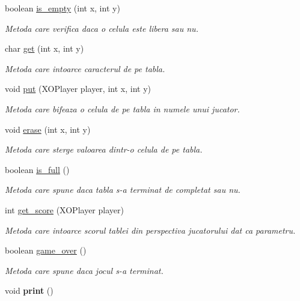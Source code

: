 \begin{DoxyCompactItemize}
\item 
boolean \hyperlink{classXOBoard_a6c374e5e5961b1223e08df188c276379}{is\_\-empty} (int x, int y)
\begin{DoxyCompactList}\small\item\em Metoda care verifica daca o celula este libera sau nu. \item\end{DoxyCompactList}\item 
char \hyperlink{classXOBoard_a45c7e3b053887aed0d4fbaf27bad4789}{get} (int x, int y)
\begin{DoxyCompactList}\small\item\em Metoda care intoarce caracterul de pe tabla. \item\end{DoxyCompactList}\item 
void \hyperlink{classXOBoard_a21c932338885c299354e4f702a632dae}{put} (XOPlayer player, int x, int y)
\begin{DoxyCompactList}\small\item\em Metoda care bifeaza o celula de pe tabla in numele unui jucator. \item\end{DoxyCompactList}\item 
void \hyperlink{classXOBoard_a6e72af673a48b7a4de79d7b738a690c1}{erase} (int x, int y)
\begin{DoxyCompactList}\small\item\em Metoda care sterge valoarea dintr-\/o celula de pe tabla. \item\end{DoxyCompactList}\item 
boolean \hyperlink{classXOBoard_aabd4973f2aec517e4a260834170c8fe5}{is\_\-full} ()
\begin{DoxyCompactList}\small\item\em Metoda care spune daca tabla s-\/a terminat de completat sau nu. \item\end{DoxyCompactList}\item 
int \hyperlink{classXOBoard_ac7efc6b2b81c1ad846984a887394fbbc}{get\_\-score} (XOPlayer player)
\begin{DoxyCompactList}\small\item\em Metoda care intoarce scorul tablei din perspectiva jucatorului dat ca parametru. \item\end{DoxyCompactList}\item 
boolean \hyperlink{classXOBoard_a7bf161fef927f1271ccaa018b2fc8d10}{game\_\-over} ()
\begin{DoxyCompactList}\small\item\em Metoda care spune daca jocul s-\/a terminat. \item\end{DoxyCompactList}\item 
\hypertarget{classXOBoard_a1d963dd14185fa970577f23e5559f6a0}{
void {\bfseries print} ()}
\label{classXOBoard_a1d963dd14185fa970577f23e5559f6a0}


\end{DoxyCompactItemize}
